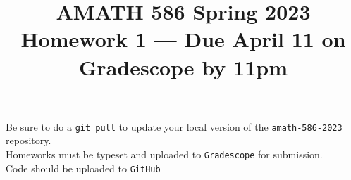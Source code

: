 \documentclass[10pt]{amsart}
\begin{document}
\pagestyle{empty}

\newcommand{\mline}{\vspace{.2in}\hrule\vspace{.2in}}


\title{\bf { AMATH 586 Spring 2023 \\ Homework 1 ---
Due April 11 on Gradescope by 11pm} }
\maketitle
\begin{center} Be sure to do a {\tt git pull} to update your local
  version of the {\tt amath-586-2023} repository.\\  Homeworks must be
  typeset and uploaded to {\tt Gradescope} for submission.\\
  Code should be uploaded to {\tt GitHub}
  \end{center}
\end{document}
